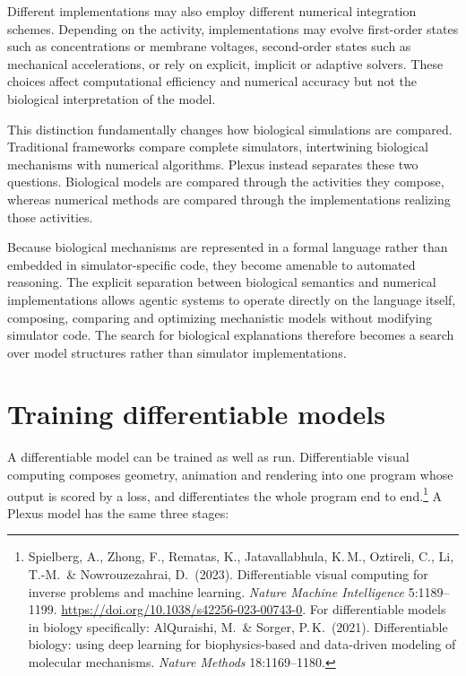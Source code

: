 \documentclass[11pt]{article}
\begin{document}
Different implementations may also employ different numerical integration schemes.
Depending on the activity, implementations may evolve first-order states such as
concentrations or membrane voltages, second-order states such as mechanical
accelerations, or rely on explicit, implicit or adaptive solvers. These choices affect
computational efficiency and numerical accuracy but not the biological interpretation
of the model.

This distinction fundamentally changes how biological simulations are compared.
Traditional frameworks compare complete simulators, intertwining biological
mechanisms with numerical algorithms. Plexus instead separates these two questions.
Biological models are compared through the activities they compose, whereas numerical
methods are compared through the implementations realizing those activities.

Because biological mechanisms are represented in a formal language rather than
embedded in simulator-specific code, they become amenable to automated reasoning. The
explicit separation between biological semantics and numerical implementations allows
agentic systems to operate directly on the language itself, composing, comparing and
optimizing mechanistic models without modifying simulator code. The search for
biological explanations therefore becomes a search over model structures rather than
simulator implementations.

\section{Training differentiable models}\label{sec:training}

A differentiable model can be trained as well as run. Differentiable visual computing
composes geometry, animation and rendering into one program whose output is scored by a
loss, and differentiates the whole program end to end.\footnote{Spielberg, A., Zhong, F.,
Rematas, K., Jatavallabhula, K.\,M., Oztireli, C., Li, T.-M.\ \& Nowrouzezahrai, D.\ (2023).
Differentiable visual computing for inverse problems and machine learning. \emph{Nature
Machine Intelligence} 5:1189--1199. \url{https://doi.org/10.1038/s42256-023-00743-0}. For
differentiable models in biology specifically: AlQuraishi, M.\ \& Sorger, P.\,K.\ (2021).
Differentiable biology: using deep learning for biophysics-based and data-driven modeling of
molecular mechanisms. \emph{Nature Methods} 18:1169--1180.} A Plexus model has the same
three stages:
\end{document}
